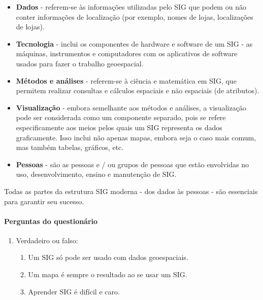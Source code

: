 \documentclass[
]{book}
\providecommand{\tightlist}{%
  \setlength{\itemsep}{0pt}\setlength{\parskip}{0pt}}
\begin{document}
\begin{itemize}
\tightlist
\item
  \textbf{Dados} - referem-se às informações utilizadas pelo SIG que podem ou não conter informações de localização (por exemplo, nomes de lojas, localizações de lojas).
\item
  \textbf{Tecnologia} - inclui os componentes de hardware e software de um SIG - as máquinas, instrumentos e computadores com os aplicativos de software usados para fazer o trabalho geoespacial.
\item
  \textbf{Métodos e análises} - referem-se à ciência e matemática em SIG, que permitem realizar consultas e cálculos espaciais e não espaciais (de atributos).
\item
  \textbf{Visualização} - embora semelhante aos métodos e análises, a visualização pode ser considerada como um componente separado, pois se refere especificamente aos meios pelos quais um SIG representa os dados graficamente. Isso inclui não apenas mapas, embora seja o caso mais comum, mas também tabelas, gráficos, etc.
\item
  \textbf{Pessoas} - são as pessoas e / ou grupos de pessoas que estão envolvidas no uso, desenvolvimento, ensino e manutenção de SIG.
\end{itemize}

Todas as partes da estrutura SIG moderna - dos dados às pessoas - são essenciais para garantir seu sucesso.

\hypertarget{perguntas-do-questionuxe1rio}{%
\paragraph{Perguntas do questionário}\label{perguntas-do-questionuxe1rio}}

\begin{enumerate}
\def\labelenumi{\arabic{enumi}.}
\tightlist
\item
  Verdadeiro ou falso:

  \begin{enumerate}
  \def\labelenumii{\arabic{enumii}.}
  \tightlist
  \item
    Um SIG só pode ser usado com dados geoespaciais.
  \item
    Um mapa é sempre o resultado ao se usar um SIG.
  \item
    Aprender SIG é difícil e caro.
  \end{enumerate}
\end{enumerate}
\end{document}
